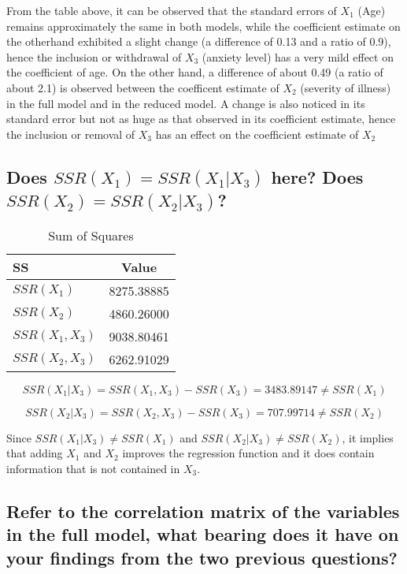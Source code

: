 \documentclass[a4paper,9pt]{article}\usepackage[]{graphicx}\usepackage[]{color}
\begin{document}
From the table above, it can be observed that the standard errors of $X_1$ (Age) remains approximately the same in both models, while the coefficient estimate on the otherhand exhibited a slight change (a difference of 0.13 and a ratio of 0.9), hence the inclusion or withdrawal of $X_3$ (anxiety level) has a very mild effect on the coefficient of age. On the other hand, a difference  of about 0.49 (a ratio of about 2.1) is observed between the coefficent estimate of $X_2$ (severity of illness) in the full model and in the reduced model. A change is also noticed in its standard error but not as huge as that observed in its coefficient estimate, hence the inclusion or removal of $X_3$ has an effect on the coefficient estimate of $X_2$

\subsection*{Does $SSR(X_1) = SSR(X_1|X_3)$ here? Does $SSR(X_2) = SSR(X_2|X_3)$? }

\begin{table}[h]
\centering
\begin{tabular}{lc}
\hline
SS & Value\\
\hline
$SSR(X_1)$ & 8275.38885\\
$SSR(X_2)$ & 4860.26000 \\
$SSR(X_1,X_3)$ & 9038.80461\\
$SSR(X_2,X_3)$ & 6262.91029\\
\hline
\end{tabular}
\caption{Sum of Squares}
\end{table}

$$ SSR(X_{1}|X_{3}) = SSR(X_{1},X_{3}) - SSR(X_{3}) = 3483.89147 \neq SSR(X_1)$$

$$ SSR(X_{2}|X_{3}) = SSR(X_{2},X_{3}) - SSR(X_{3}) = 707.99714 \neq SSR(X_2)$$

Since $SSR(X_{1}|X_{3}) \neq SSR(X_1)$ and $SSR(X_{2}|X_{3}) \neq SSR(X_2)$, it implies that adding $X_1$ and $X_2$ improves the regression function and it does contain information that is not contained in $X_3$.

\subsection*{Refer to the correlation matrix of the variables in the full model, what bearing does it have on your findings from the two previous questions?}
\end{document}
